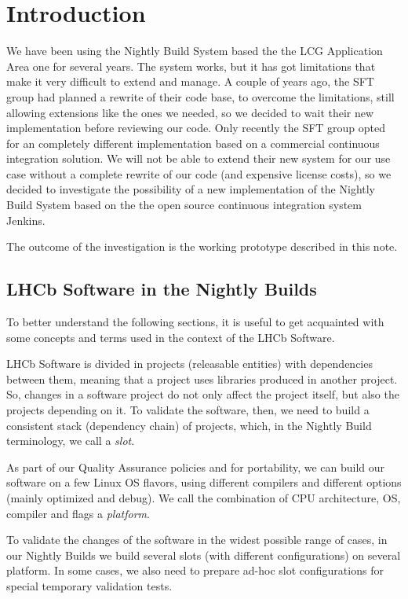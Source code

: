 
\section{Introduction}
\label{sec:Introduction}

We have been using the Nightly Build System based the the LCG Application Area
one for several years\cite{Kruzelecki:2010zz}.  The system works, but it has got
limitations that make it very difficult to extend and manage.  A couple of years
ago, the SFT group had planned a rewrite of their code base, to overcome the
limitations, still allowing extensions like the ones we needed, so we decided to
wait their new implementation before reviewing our code.  Only recently the SFT
group opted for an completely different implementation based on a commercial
continuous integration solution.  We will not be able to extend their new system
for our use case without a complete rewrite of our code (and expensive license
costs), so we decided to investigate the possibility of a new implementation of
the Nightly Build System based on the the open source continuous integration
system Jenkins\cite{Jenkins}.

The outcome of the investigation is the working prototype described in this
note.

\subsection{LHCb Software in the Nightly Builds}
To better understand the following sections, it is useful to get acquainted with
some concepts and terms used in the context of the LHCb Software.

LHCb Software is divided in projects (releasable entities) with dependencies
between them, meaning that a project uses libraries produced in another project.
So, changes in a software project do not only affect the project itself, but
also the projects depending on it.  To validate the software, then, we need to
build a consistent stack (dependency chain) of projects, which, in the Nightly
Build terminology, we call a \emph{slot}.

As part of our Quality Assurance policies and for portability, we can build our
software on a few Linux OS flavors, using different compilers and different
options (mainly optimized and debug).  We call the combination of CPU
architecture, OS, compiler and flags a \emph{platform}.

To validate the changes of the software in the widest possible range of cases,
in our Nightly Builds we build several slots (with different configurations) on
several platform.  In some cases, we also need to prepare ad-hoc slot
configurations for special temporary validation tests.
